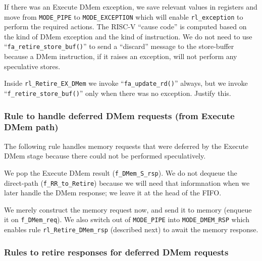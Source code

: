 If there was an Execute DMem exception, we save relevant values in
registers and move from \verb|MODE_PIPE| to \verb|MODE_EXCEPTION|
which will enable \verb|rl_exception| to perform the required actions.
The RISC-V ``cause code'' is computed based on the kind of DMem
exception and the kind of instruction.  We do not need to use
``\verb|fa_retire_store_buf()|'' to send a ``discard'' message to the
store-buffer because a DMem instruction, if it raises an exception,
will not perform any speculative stores.


\Exercise

Inside \verb|rl_Retire_EX_DMem| we invoke ``\verb|fa_update_rd()|''
always, but we invoke ``\verb|f_retire_store_buf()|'' only when there
was no exception.  Justify this.

\Endexercise


\subsubsection{Rule to handle deferred DMem requests (from Execute DMem path)}

\label{Sec_Fife_DMem_deferred}

The following rule handles memory requests that were deferred by the
Execute DMem stage because there could not be performed speculatively.



We pop the Execute DMem result (\verb|f_DMem_S_rsp|).  We do not
dequeue the direct-path (\verb|f_RR_to_Retire|) because we will need
that informnation when we later handle the DMem response; we leave it
at the head of the FIFO.

We merely construct the memory request now, and send it to memory
(enqueue it on \verb|f_DMem_req|).  We also switch out of
\verb|MODE_PIPE| into \verb|MODE_DMEM_RSP| which enables rule
\verb|rl_Retire_DMem_rsp| (described next) to await the memory
response.


\subsubsection{Rules to retire responses for deferred DMem requests}

